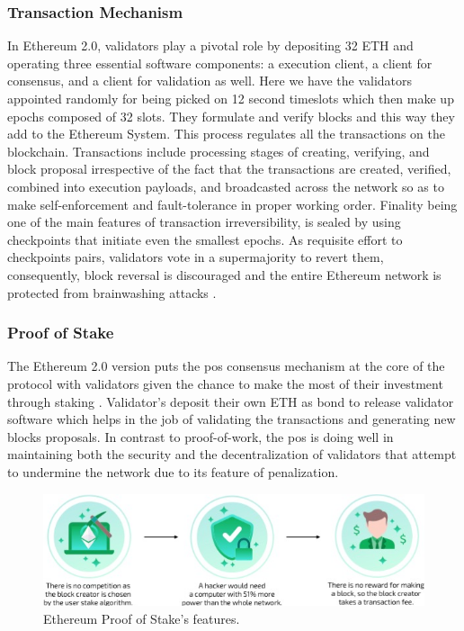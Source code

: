 \subsubsection{Transaction Mechanism}

In Ethereum 2.0, validators play a pivotal role by depositing 32 ETH and operating three essential software components: a execution client, a client for consensus, and a client for 
validation as well. Here we have the validators appointed randomly for being picked on 12 second timeslots which then make up epochs composed of 32 slots. They formulate 
and verify blocks and this way they add to the Ethereum System. This process regulates all the transactions on the blockchain. Transactions include processing stages of 
creating, verifying, and block proposal irrespective of the fact that the transactions are created, verified, combined into execution payloads, and broadcasted across 
the network so as to make self-enforcement and fault-tolerance in proper working order. Finality being one of the main features of transaction irreversibility, is 
sealed by using checkpoints that initiate even the smallest epochs. As requisite effort to checkpoints pairs, validators vote in a supermajority to revert them, 
consequently, block reversal is discouraged and the entire Ethereum network is protected from brainwashing attacks \cite{ethereumpos}.

\subsubsection{Proof of Stake}

The Ethereum 2.0 version puts the \gls{pos} consensus mechanism at the core of the protocol with validators given the chance to make the most of their 
investment through staking \cite{ethereumpos}. Validator's deposit their own ETH as bond to release validator software which helps in the job of validating the transactions and 
generating new blocks proposals. In contrast to proof-of-work, the \gls{pos} is doing well in maintaining both the security and the decentralization of validators that 
attempt to undermine the network due to its feature of penalization.

\begin{figure}[h]  
  \centering
  \includegraphics[width=1\textwidth]{Images/c2_4.png} 
  \caption{Ethereum Proof of Stake's features.}
\end{figure}


